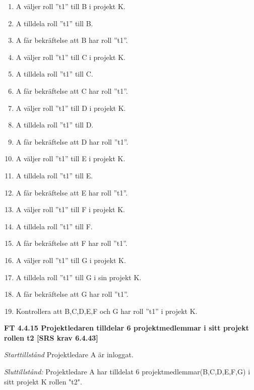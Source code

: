 \documentclass[a4paper]{article}
\begin{document}
\begin{enumerate}
\item A väljer roll ”t1” till B i projekt K.
\item A tilldela roll ”t1” till B. 
\item A får bekräftelse att B har roll ”t1”.
\item A väljer roll ”t1” till C i projekt K. 
\item A tilldela roll ”t1” till C. 
\item A får bekräftelse att C har roll ”t1”.
\item A väljer roll ”t1” till D i projekt K.
\item A tilldela roll ”t1” till D.
\item A får bekräftelse att D har roll ”t1”.
\item A väljer roll ”t1” till E i projekt K.
\item A tilldela roll ”t1” till E. 
\item A får bekräftelse att E har roll ”t1”.
\item A väljer roll ”t1” till F i projekt K.
\item A tilldela roll ”t1” till F.
\item A får bekräftelse att F har roll ”t1”.
\item A väljer roll ”t1” till G i projekt K.
\item A tilldela roll ”t1” till G i sin projekt K.
\item A får bekräftelse att G har roll ”t1”.
\item Kontrollera att B,C,D,E,F och G har roll ”t1” i projekt K.
\end{enumerate}
\textbf{FT 4.4.15 Projektledaren tilldelar 6 projektmedlemmar i sitt projekt rollen t2 [SRS krav 6.4.43]}

\emph{Starttillstånd} Projektledare A är inloggat.

\emph{Sluttillstånd:} Projektledare A  har tilldelat 6 projektmedlemmar(B,C,D,E,F,G) i sitt projekt K rollen "t2".
\end{document}
